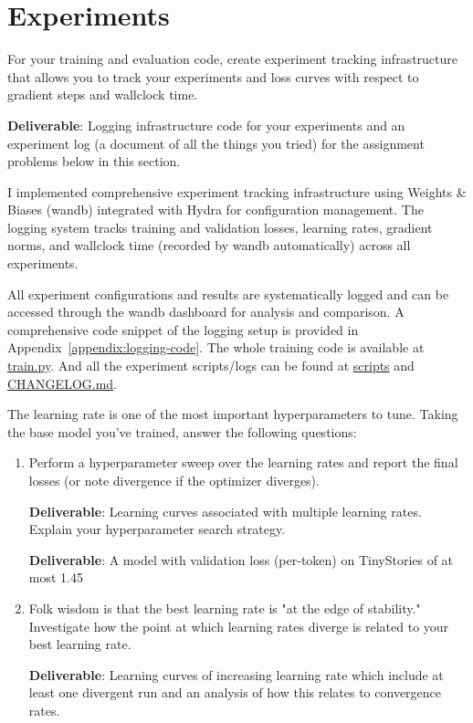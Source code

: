 \section{Experiments}


For your training and evaluation code, create experiment tracking infrastructure that allows you to track your experiments and loss curves with respect to gradient steps and wallclock time.

\textbf{Deliverable}: Logging infrastructure code for your experiments and an experiment log (a document of all the things you tried) for the assignment problems below in this section.

\begin{answer}
I implemented comprehensive experiment tracking infrastructure using Weights \& Biases (wandb) integrated with Hydra for configuration management. The logging system tracks training and validation losses, learning rates, gradient norms, and wallclock time (recorded by wandb automatically) across all experiments.

All experiment configurations and results are systematically logged and can be accessed through the wandb dashboard for analysis and comparison. A comprehensive code snippet of the logging setup is provided in Appendix~\ref{appendix:logging-code}. The whole training code is available at \href{https://github.com/donglinkang2021/assignment1-basics/blob/main/train.py}{train.py}. And all the experiment scripts/logs can be found at \href{https://github.com/donglinkang2021/assignment1-basics/tree/main/scripts}{scripts} and \href{https://github.com/donglinkang2021/assignment1-basics/blob/main/docs/CHANGELOG.md}{CHANGELOG.md}.

\end{answer}


The learning rate is one of the most important hyperparameters to tune. Taking the base model you've trained, answer the following questions:

\begin{enumerate}[label=(\alph*)]
    \item Perform a hyperparameter sweep over the learning rates and report the final losses (or note divergence if the optimizer diverges).
    
    \textbf{Deliverable}: Learning curves associated with multiple learning rates. Explain your hyperparameter search strategy.
    
    \textbf{Deliverable}: A model with validation loss (per-token) on TinyStories of at most 1.45
    
    \item Folk wisdom is that the best learning rate is "at the edge of stability." Investigate how the point at which learning rates diverge is related to your best learning rate.
    
    \textbf{Deliverable}: Learning curves of increasing learning rate which include at least one divergent run and an analysis of how this relates to convergence rates.
\end{enumerate}

